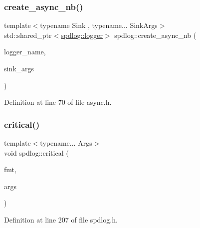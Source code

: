 \subsubsection{\texorpdfstring{create\+\_\+async\+\_\+nb()}{create\_async\_nb()}}
{\footnotesize\ttfamily template$<$typename Sink , typename... Sink\+Args$>$ \\
std\+::shared\+\_\+ptr$<$\hyperlink{classspdlog_1_1logger}{spdlog\+::logger}$>$ spdlog\+::create\+\_\+async\+\_\+nb (\begin{DoxyParamCaption}\item[{std\+::string}]{logger\+\_\+name,  }\item[{Sink\+Args \&\&...}]{sink\+\_\+args }\end{DoxyParamCaption})\hspace{0.3cm}{\ttfamily [inline]}}



Definition at line 70 of file async.\+h.

\mbox{\label{namespacespdlog_a753989ee0011b7d977e04a278b9380a2}} 
\subsubsection{\texorpdfstring{critical()}{critical()}\hspace{0.1cm}{\footnotesize\ttfamily [1/2]}}
{\footnotesize\ttfamily template$<$typename... Args$>$ \\
void spdlog\+::critical (\begin{DoxyParamCaption}\item[{const char $\ast$}]{fmt,  }\item[{const Args \&...}]{args }\end{DoxyParamCaption})\hspace{0.3cm}{\ttfamily [inline]}}



Definition at line 207 of file spdlog.\+h.

